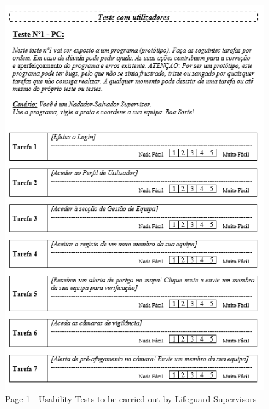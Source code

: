 \begin{figure}[H]
      \centering
      \includegraphics[width=14cm]{figs/UsabilityTest_Supervisor_1.png}
      \caption{Page 1 - Usability Tests to be carried out by Lifeguard Supervisors}
      \label{fig:UsabilityTest_Supervisor}
\end{figure}
